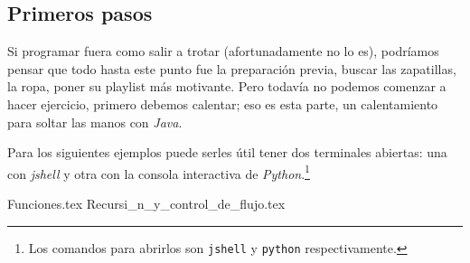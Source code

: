 \subsection{Primeros pasos}
  Si programar fuera como salir a trotar (afortunadamente no lo es), podríamos pensar que todo hasta
  este punto fue la preparación previa, buscar las zapatillas, la ropa, poner su playlist más 
  motivante.
  Pero todavía no podemos comenzar a hacer ejercicio, primero debemos calentar; eso es esta parte, 
  un calentamiento para soltar las manos con \textit{Java}.

  Para los siguientes ejemplos puede serles útil tener dos terminales abiertas: una con 
  \textit{jshell} y otra con la consola interactiva de \textit{Python}.\footnote{Los comandos para 
  abrirlos son \texttt{jshell} y \texttt{python} respectivamente.}

  {Funciones.tex}
  {Recursi_n_y_control_de_flujo.tex}